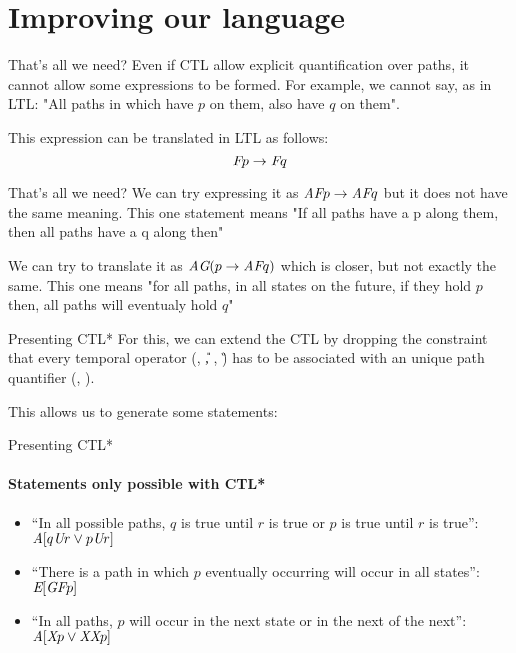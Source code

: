 \section{Improving our language}
\begin{frame}{That's all we need?}
    Even if CTL allow explicit quantification over paths, it cannot allow some expressions to be formed. For example, we cannot say, as in LTL: "All paths in which have $p$ on them, also have $q$ on them".

    This expression can be translated in LTL as follows: 
    $$\textit{F} p \to \textit{F} q$$
\end{frame}

\begin{frame}{That's all we need?}
    We can try expressing it as $\textit{A}\textit{F} p \to \textit{A}\textit{F} q$ but it does not have the same meaning. This one statement means "If all paths have a p along them, then all paths have a q along then"\pause
    
    We can try to translate it as $\textit{A}\textit{G}(p\to\textit{A}\textit{F} q)$ which is closer, but not exactly the same. This one means "for all paths, in all states on the future, if they hold $p$ then, all paths will eventualy hold $q$"
\end{frame}

\begin{frame}{Presenting CTL*}
    For this, we can extend the CTL by dropping the constraint that every temporal operator (\X, \U, \F, \G) has to be associated with an unique path quantifier (\A, \E). \pause
    
    This allows us to generate some statements:
\end{frame}

\begin{frame}{Presenting CTL*}
    \framesubtitle{Statements only possible with CTL*}
        \begin{itemize}
            \item
            {
                ``In all possible paths, $q$ is true until $r$ is true or $p$ is true until $r$ is true'': $\textit{A}[q \textit{U} r \lor p \textit{U} r]$
                \pause
            }
            \item
            {
                ``There is a path in which $p$ eventually occurring will occur in all states'': $\textit{E}[\textit{G}\textit{F} p]$
                \pause
            }
            \item
            {
                ``In all paths, $p$ will occur in the next state or in the next of the next'': $\textit{A}[\textit{X} p \lor \textit{X}\textit{X} p]$
            }
        \end{itemize}
\end{frame}

